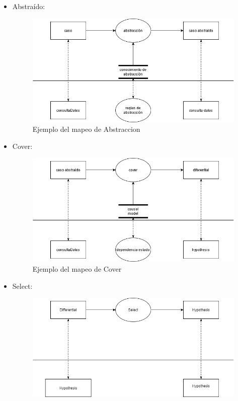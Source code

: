 \begin{itemize}
  \item Abstraído:
  \begin{figure}[H]
    \centering
    \includegraphics[scale=0.55]{imagenes/abstraccion_inferencia.png}
    \caption{\label{fig:Cover}Ejemplo del mapeo de Abstraccion}
  \end{figure}
  \item Cover:  
  \begin{figure}[H]
    \centering
    \includegraphics[scale=0.50]{imagenes/cover2.png}
    \caption{\label{fig:Cover}Ejemplo del mapeo de Cover}
  \end{figure}
  \item Select: 
  \begin{figure}[H]
    \centering
    \includegraphics[scale=0.50]{imagenes/select.png}

\end{figure}
\end{itemize}
